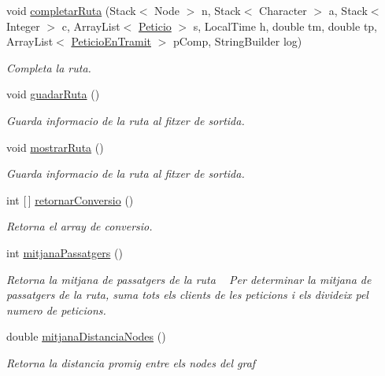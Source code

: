 \begin{DoxyCompactItemize}
void \hyperlink{class_portam_a_pro_p_1_1_ruta_a02289a460a871a5016fd9725aa46828a}{completar\+Ruta} (Stack$<$ Node $>$ n, Stack$<$ Character $>$ a, Stack$<$ Integer $>$ c, Array\+List$<$ \hyperlink{class_portam_a_pro_p_1_1_peticio}{Peticio} $>$ s, Local\+Time h, double tm, double tp, Array\+List$<$ \hyperlink{class_portam_a_pro_p_1_1_peticio_en_tramit}{Peticio\+En\+Tramit} $>$ p\+Comp, String\+Builder log)
\begin{DoxyCompactList}\small\item\em Completa la ruta. \end{DoxyCompactList}\item 
void \hyperlink{class_portam_a_pro_p_1_1_ruta_addebfd63d9ae2e9797d755dcba205ac4}{guadar\+Ruta} ()
\begin{DoxyCompactList}\small\item\em Guarda informacio de la ruta al fitxer de sortida. \end{DoxyCompactList}\item 
void \hyperlink{class_portam_a_pro_p_1_1_ruta_a35b6d0accf1a144ab616760ae2e34e49}{mostrar\+Ruta} ()
\begin{DoxyCompactList}\small\item\em Guarda informacio de la ruta al fitxer de sortida. \end{DoxyCompactList}\item 
int \mbox{[}$\,$\mbox{]} \hyperlink{class_portam_a_pro_p_1_1_ruta_ab6ab0fe415c2a1925e21c495d350d798}{retornar\+Conversio} ()
\begin{DoxyCompactList}\small\item\em Retorna el array de conversio. \end{DoxyCompactList}\item 
int \hyperlink{class_portam_a_pro_p_1_1_ruta_adbf94c3c5a00e9737f821c3794034e3a}{mitjana\+Passatgers} ()
\begin{DoxyCompactList}\small\item\em Retorna la mitjana de passatgers de la ruta ~\newline
 Per determinar la mitjana de passatgers de la ruta, suma tots els clients de les peticions i els divideix pel numero de peticions. \end{DoxyCompactList}\item 
double \hyperlink{class_portam_a_pro_p_1_1_ruta_afb5d2dd60a54765c4764866f9cc78fc8}{mitjana\+Distancia\+Nodes} ()
\begin{DoxyCompactList}\small\item\em Retorna la distancia promig entre els nodes del graf ~\newline

\end{DoxyCompactList}
\end{DoxyCompactItemize}

